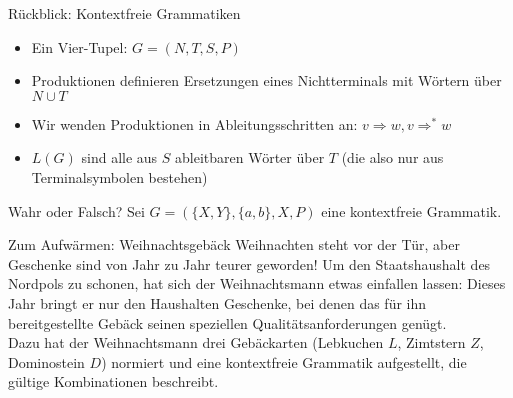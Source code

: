 \newcommand{\mydate}{16.12.2016}

\newcommand{\handout}{}




\usepackage{tikz}
\usetikzlibrary{arrows}
   \usetikzlibrary{automata}
   \usetikzlibrary{matrix}
\usepackage{url}

\graphicspath{{../figures/}}





\framePrevEpisode

\begin{frame}{Rückblick: Kontextfreie Grammatiken}
	\begin{itemize}[<+->]
		\item Ein Vier-Tupel: $G = (N, T, S, P)$
		\item Produktionen definieren Ersetzungen eines Nichtterminals mit Wörtern über $N \cup T$
		\item Wir wenden Produktionen in Ableitungsschritten an: $v \Rightarrow w, v \Rightarrow^* w$
		\item $L(G)$ sind alle aus $S$ ableitbaren Wörter über $T$ (die also nur aus Terminalsymbolen bestehen)
	\end{itemize}
\end{frame}

\begin{frame}{Wahr oder Falsch?}
	Sei $G=(\{X,Y\},\{a,b\},X,P)$ eine kontextfreie Grammatik.
	\begin{itemize}
	\end{itemize}
\end{frame}

\begin{frame}{Zum Aufwärmen: Weihnachtsgebäck}
	Weihnachten steht vor der Tür, aber Geschenke sind von Jahr zu Jahr teurer geworden! Um den Staatshaushalt des Nordpols zu schonen, hat sich der Weihnachtsmann etwas einfallen lassen: Dieses Jahr bringt er nur den Haushalten Geschenke, bei denen das für ihn bereitgestellte Gebäck seinen speziellen Qualitätsanforderungen genügt.\\[1em]
	
	Dazu hat der Weihnachtsmann drei Gebäckarten (Lebkuchen $L$, Zimtstern $Z$, Dominostein $D$) normiert und eine kontextfreie Grammatik aufgestellt, die gültige Kombinationen beschreibt.
\end{frame}

